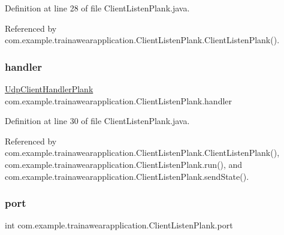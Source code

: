 Definition at line 28 of file Client\+Listen\+Plank.\+java.



Referenced by com.\+example.\+trainawearapplication.\+Client\+Listen\+Plank.\+Client\+Listen\+Plank().

\mbox{\label{classcom_1_1example_1_1trainawearapplication_1_1_client_listen_plank_ac90c43ada4fdc1f7865f8ab39865b980}} 
\subsubsection{\texorpdfstring{handler}{handler}}
{\footnotesize\ttfamily \mbox{\hyperlink{classcom_1_1example_1_1trainawearapplication_1_1_udp_client_handler_plank}{Udp\+Client\+Handler\+Plank}} com.\+example.\+trainawearapplication.\+Client\+Listen\+Plank.\+handler\hspace{0.3cm}{\ttfamily [package]}}



Definition at line 30 of file Client\+Listen\+Plank.\+java.



Referenced by com.\+example.\+trainawearapplication.\+Client\+Listen\+Plank.\+Client\+Listen\+Plank(), com.\+example.\+trainawearapplication.\+Client\+Listen\+Plank.\+run(), and com.\+example.\+trainawearapplication.\+Client\+Listen\+Plank.\+send\+State().

\mbox{\label{classcom_1_1example_1_1trainawearapplication_1_1_client_listen_plank_aa394560dfa0da718f5ca639b82795395}} 
\subsubsection{\texorpdfstring{port}{port}}
{\footnotesize\ttfamily int com.\+example.\+trainawearapplication.\+Client\+Listen\+Plank.\+port\hspace{0.3cm}{\ttfamily [private]}}



